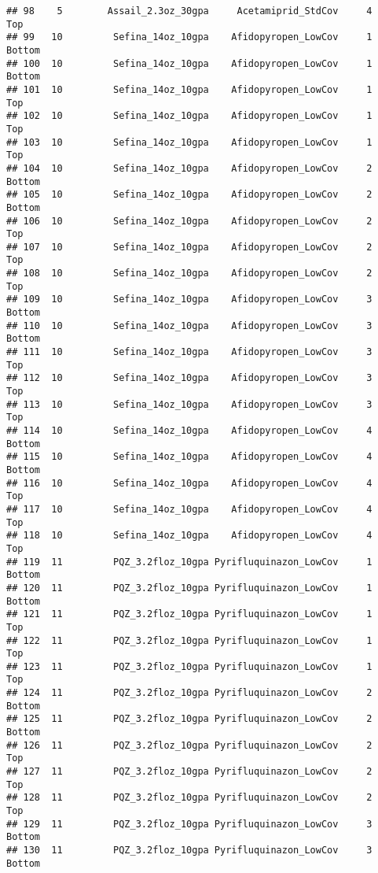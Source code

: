 \documentclass[
]{article}
\begin{document}
\begin{verbatim}
## 98    5        Assail_2.3oz_30gpa     Acetamiprid_StdCov     4           Top
## 99   10         Sefina_14oz_10gpa    Afidopyropen_LowCov     1        Bottom
## 100  10         Sefina_14oz_10gpa    Afidopyropen_LowCov     1        Bottom
## 101  10         Sefina_14oz_10gpa    Afidopyropen_LowCov     1           Top
## 102  10         Sefina_14oz_10gpa    Afidopyropen_LowCov     1           Top
## 103  10         Sefina_14oz_10gpa    Afidopyropen_LowCov     1           Top
## 104  10         Sefina_14oz_10gpa    Afidopyropen_LowCov     2        Bottom
## 105  10         Sefina_14oz_10gpa    Afidopyropen_LowCov     2        Bottom
## 106  10         Sefina_14oz_10gpa    Afidopyropen_LowCov     2           Top
## 107  10         Sefina_14oz_10gpa    Afidopyropen_LowCov     2           Top
## 108  10         Sefina_14oz_10gpa    Afidopyropen_LowCov     2           Top
## 109  10         Sefina_14oz_10gpa    Afidopyropen_LowCov     3        Bottom
## 110  10         Sefina_14oz_10gpa    Afidopyropen_LowCov     3        Bottom
## 111  10         Sefina_14oz_10gpa    Afidopyropen_LowCov     3           Top
## 112  10         Sefina_14oz_10gpa    Afidopyropen_LowCov     3           Top
## 113  10         Sefina_14oz_10gpa    Afidopyropen_LowCov     3           Top
## 114  10         Sefina_14oz_10gpa    Afidopyropen_LowCov     4        Bottom
## 115  10         Sefina_14oz_10gpa    Afidopyropen_LowCov     4        Bottom
## 116  10         Sefina_14oz_10gpa    Afidopyropen_LowCov     4           Top
## 117  10         Sefina_14oz_10gpa    Afidopyropen_LowCov     4           Top
## 118  10         Sefina_14oz_10gpa    Afidopyropen_LowCov     4           Top
## 119  11         PQZ_3.2floz_10gpa Pyrifluquinazon_LowCov     1        Bottom
## 120  11         PQZ_3.2floz_10gpa Pyrifluquinazon_LowCov     1        Bottom
## 121  11         PQZ_3.2floz_10gpa Pyrifluquinazon_LowCov     1           Top
## 122  11         PQZ_3.2floz_10gpa Pyrifluquinazon_LowCov     1           Top
## 123  11         PQZ_3.2floz_10gpa Pyrifluquinazon_LowCov     1           Top
## 124  11         PQZ_3.2floz_10gpa Pyrifluquinazon_LowCov     2        Bottom
## 125  11         PQZ_3.2floz_10gpa Pyrifluquinazon_LowCov     2        Bottom
## 126  11         PQZ_3.2floz_10gpa Pyrifluquinazon_LowCov     2           Top
## 127  11         PQZ_3.2floz_10gpa Pyrifluquinazon_LowCov     2           Top
## 128  11         PQZ_3.2floz_10gpa Pyrifluquinazon_LowCov     2           Top
## 129  11         PQZ_3.2floz_10gpa Pyrifluquinazon_LowCov     3        Bottom
## 130  11         PQZ_3.2floz_10gpa Pyrifluquinazon_LowCov     3        Bottom

\end{verbatim}
\end{document}
